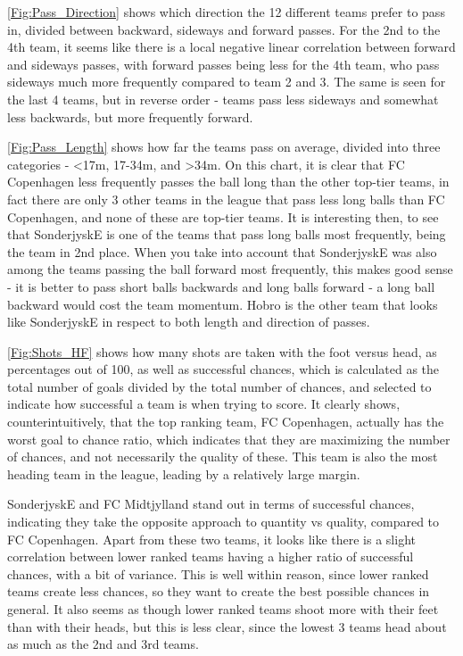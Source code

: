 \documentclass[Report.tex]{subfiles}
\begin{document}
\ref{Fig:Pass_Direction} shows which direction the 12 different teams prefer to pass in,
divided between backward, sideways and forward passes. For the 2nd to the 4th
team, it seems like there is a local negative linear correlation between forward
and sideways passes, with forward passes being less for the 4th team, who pass
sideways much more frequently compared to team 2 and 3. The same is seen for the
last 4 teams, but in reverse order - teams pass less sideways and somewhat less
backwards, but more frequently forward. 

\ref{Fig:Pass_Length} shows how far the teams pass on average, divided into three
categories - <17m, 17-34m, and >34m. 
On this chart, it is clear that FC Copenhagen less frequently passes the ball
long than the other top-tier teams, in fact there are only 3 other teams in the
league that pass less long balls than FC Copenhagen, and none of these are
top-tier teams. It is interesting then, to see that SonderjyskE is one of the
teams that pass long balls most frequently, being the team in 2nd place. When
you take into account that SonderjyskE was also among the teams passing the ball
forward most frequently, this makes good sense - it is better to pass short
balls backwards and long balls forward - a long ball backward would cost the
team momentum. Hobro is the other team that looks like SonderjyskE in respect to
both length and direction of passes. 

\ref{Fig:Shots_HF} shows how many shots are taken with the foot versus head, as
percentages out of 100, as well as successful chances, which is calculated as
the total number of goals divided by the total number of chances, and selected
to indicate how successful a team is when trying to score. 
It clearly shows, counterintuitively, that the top ranking team, FC Copenhagen,
actually has the worst goal to chance ratio, which indicates that they are
maximizing the number of chances, and not necessarily the quality of these. This
team is also the most heading team in the league, leading by a relatively large
margin. 

SonderjyskE and FC Midtjylland stand out in terms of successful chances,
indicating they take the opposite approach to quantity vs quality, compared to
FC Copenhagen. Apart from these two teams, it looks like there is a slight
correlation between lower ranked teams having a higher ratio of successful
chances, with a bit of variance. This is well within reason, since lower ranked
teams create less chances, so they want to create the best possible chances in
general. It also seems as though lower ranked teams shoot more with their feet
than with their heads, but this is less clear, since the lowest 3 teams head
about as much as the 2nd and 3rd teams. 
\end{document}

